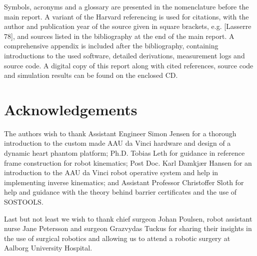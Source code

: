 Symbols, acronyms and a glossary are presented in the nomenclature before the main report.
A variant of the Harvard referencing is used for citations, with the author and publication year of the source given in square brackets, e.g. [Lasserre 78], and sources listed in the bibliography at the end of the main report. %
A comprehensive appendix is included after the bibliography, containing introductions to the used software, detailed derivations, measurement logs and source code.
A digital copy of this report along with cited references, source code and simulation results can be found on the enclosed CD.

\vspace*{-2mm}
\section*{Acknowledgements}
\vspace*{-2mm}
The authors wish to thank Assistant Engineer Simon Jensen for a thorough introduction to the custom made AAU da Vinci hardware and design of a dynamic heart phantom platform; Ph.D. Tobias Leth for guidance in reference frame construction for robot kinematics;  Post Doc. Karl Damkj\ae r Hansen for an introduction to the AAU da Vinci robot operative system and help in implementing inverse kinematics; and Assistant Professor Christoffer Sloth for help and guidance with the theory behind barrier certificates and the use of SOSTOOLS.

Last but not least we wish to thank chief surgeon Johan Poulsen, robot assistant nurse Jane Petersson and surgeon Grazvydas Tuckus for sharing their insights in the use of surgical robotics and allowing us to attend a robotic surgery at Aalborg University Hospital.


